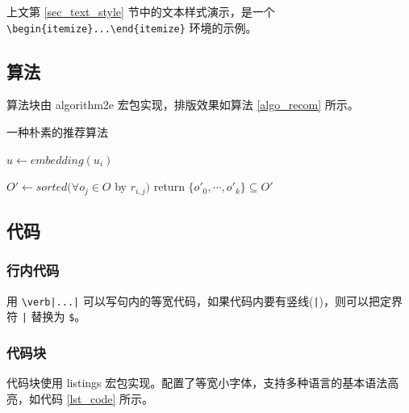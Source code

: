 \documentclass[12]{ctexart}
\begin{document}
上文第 \ref{sec_text_style} 节中的文本样式演示，是一个 \verb|\begin{itemize}...\end{itemize}| 环境的示例。

\subsection{算法}

算法块由 algorithm2e 宏包\cite{algorithm2e}实现，排版效果如算法 \ref{algo_recom} 所示。

\begin{algorithm}[H]
    \caption{一种朴素的推荐算法}
    \label{algo_recom}



    $u \leftarrow embedding(u_i)$\;


    $O' \leftarrow sorted(\forall o_j \in O$ by $r_{i,j})$\;
    return $\{o'_0, \cdots, o'_k\} \subseteq  O'$\;
\end{algorithm}

\subsection{代码}

\subsubsection{行内代码}\label{sec_inline_code}

用 \verb$\verb|...|$ 可以写句内的等宽代码，如果代码内要有竖线(\verb$|$)，则可以把定界符 \verb$|$ 替换为 \verb|$|。

\subsubsection{代码块}

代码块使用 listings 宏包\cite{listings}实现。配置了等宽小字体，支持多种语言的基本语法高亮，如代码 \ref{lst_code} 所示。
\end{document}
